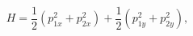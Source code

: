 \begin{equation}
   H=\frac{1}{2}(p_{1x}^2+ p_{2x}^2)+\frac{1}{2}(p_{1y}^2+ p_{2y}^2),
   \label{41}
   \end{equation} 
